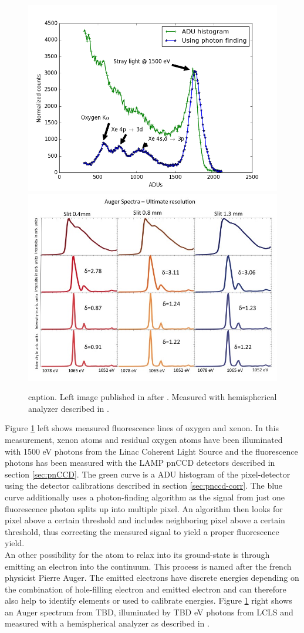 \begin{figure}
	\centering
		\includegraphics[width=.49\textwidth]{images/pnCCD-histogram.png}
		\includegraphics[width=.49\textwidth]{images/auger-spectroscopy.jpg}
	\caption{caption. Left image published in \citep{Bucher-2016-Unpublished} after \citep{Rudek-2012-NatPho}. Measured with hemispherical analyzer described in \cite{Bucher-2014-Unpublished}.}
	\label{fig:pnCCD-histogram}
\end{figure}
Figure \ref{fig:pnCCD-histogram} left shows measured fluorescence lines of oxygen and xenon. In this measurement, xenon atoms and residual oxygen atoms have been illuminated with 1500 eV photons from the Linac Coherent Light Source and the fluorescence photons has been measured with the LAMP pnCCD detectors described in section \ref{sec:pnCCD}. The green curve is a ADU histogram of the pixel-detector using the detector calibrations described in section \ref{sec:pnccd-corr}. The blue curve additionally uses a photon-finding algorithm as the signal from just one fluorescence photon splits up into multiple pixel. An algorithm then looks for pixel above a certain threshold and includes neighboring pixel above a certain threshold, thus correcting the measured signal to yield a proper fluorescence yield.\\
An other possibility for the atom to relax into its ground-state is through emitting an electron into the continuum. This process is named after the french physicist Pierre Auger. The emitted electrons have discrete energies depending on the combination of hole-filling electron and emitted electron and can therefore also help to identify elements or used to calibrate energies. Figure \ref{fig:pnCCD-histogram} right shows an Auger spectrum from TBD, illuminated by TBD eV photons from LCLS and measured with a hemispherical analyzer as described in \citep{Bucher-2014-Unpublished}.\\

